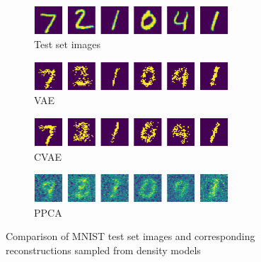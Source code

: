 \begin{figure}[H]
	\begin{subfigure}[t]{1\textwidth}
		\centering
		\includegraphics[width = 0.8\textwidth]{figures/ppca/real}
		\caption{Test set images}
		\label{fig:ppca:real2}
	\end{subfigure}
	\begin{subfigure}[t]{1\textwidth}
		\centering
		\includegraphics[width = 0.8\textwidth]{figures/vae/sample}
		\caption{VAE}
		\label{fig:vae:recon}
	\end{subfigure}
	\begin{subfigure}[t]{1\textwidth}
		\centering
		\includegraphics[width = 0.8\textwidth]{figures/cvae/sample}
		\caption{CVAE}
		\label{fig:cvae:recon}
	\end{subfigure}
	\begin{subfigure}[t]{1\textwidth}
		\centering
		\includegraphics[width = 0.8\textwidth]{figures/ppca/sample}
		\caption{PPCA}
		\label{fig:ppca:recon}
	\end{subfigure}
	\caption{Comparison of MNIST test set images and corresponding reconstructions sampled from density models}
	\label{fig:mean:_v_real}
\end{figure}


